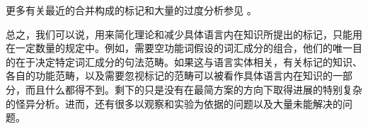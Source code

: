 
更多有关最近的合并构成的标记和大量的过度分析参见 。

总之，我们可以说，用来简化理论和减少具体语言内在知识所提出的标记，只能用在一定数量的规定中。例如，需要空功能词假设的词汇成分的组合，他们的唯一目的在于决定特定词汇成分的句法范畴。如果这与语言实体相关，有关标记的知识、各自的功能范畴，以及需要忽视标记的范畴可以被看作具体语言内在知识的一部分，而且什么都得不到。剩下的只是没有在最简方案的方向下取得进展的特别复杂的怪异分析。进而，还有很多以观察和实验为依据的问题以及大量未能解决的问题。


